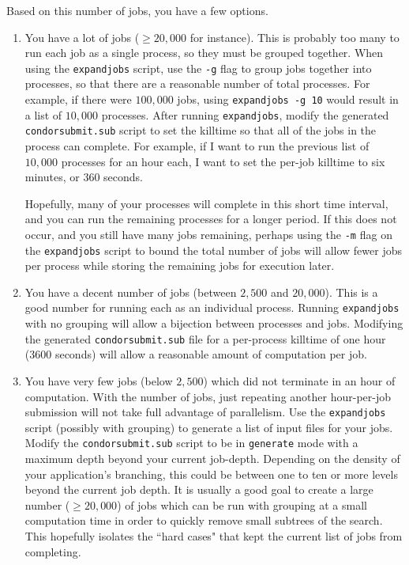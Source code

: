 \documentclass[11pt]{article}
\begin{document}
Based on this number of jobs, you have a few options.

\begin{enumerate}
	\item You have a lot of jobs ($\geq 20,000$ for instance).
		This is probably too many to run each job as a single process, 
			so they must be grouped together.
		When using the \texttt{expandjobs} script, use the \texttt{-g} flag
			to group jobs together into processes, so that
			there are a reasonable number of total processes.
		For example, if there were $100,000$ jobs, using
			\texttt{expandjobs -g 10} would result in a list of $10,000$ processes.
		After running \texttt{expandjobs}, modify the generated
			\texttt{condorsubmit.sub} script
			to set the killtime so that all of the jobs in the process
			can complete.
		For example, if I want to run the previous list of $10,000$ processes
			for an hour each, I want to set the per-job killtime to six minutes,
			or 360 seconds.
			
		Hopefully, many of your processes will complete in this short time interval,
			and you can run the remaining processes for a longer period.
		If this does not occur, and you still have many jobs remaining,
			perhaps using the \texttt{-m} flag on the \texttt{expandjobs} script
			to bound the total number of jobs will allow fewer jobs per process
			while storing the remaining jobs for execution later.
					
	\item You have a decent number of jobs (between $2,500$ and $20,000$).
		This is a good number for running each as an individual process.
		Running \texttt{expandjobs} with no grouping will allow a 
			bijection between processes and jobs.
		Modifying the generated \texttt{condorsubmit.sub} file
			for a per-process killtime of one hour (3600 seconds) 
			will allow a reasonable amount of computation per job.
	
	
	\item You have very few jobs (below $2,500$) 
			which did not terminate in an hour of computation.
		 With the number of jobs, just repeating another hour-per-job submission
		 	will not take full advantage of parallelism.
		Use the \texttt{expandjobs} script (possibly with grouping)
			to generate a list of input files for your jobs.
		Modify the \texttt{condorsubmit.sub} script to 
			be in \texttt{generate} mode with a maximum depth beyond your
			current job-depth.
		Depending on the density of your application's branching, this could
			be between one to ten or more levels beyond the current job depth.
		It is usually a good goal to create a large number ($\geq 20,000$)
			of jobs which can be run with grouping at a small computation time
			in order to quickly remove small subtrees of the search.
		This hopefully isolates the ``hard cases" 
			that kept the current list of jobs from completing.
		
\end{enumerate}
\end{document}
